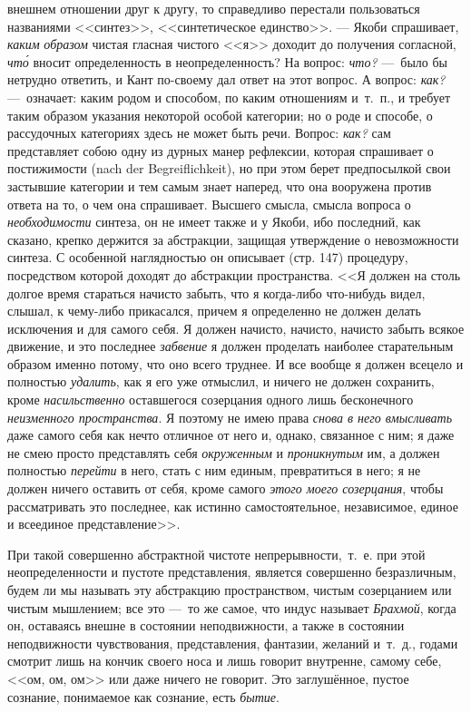 внешнем отношении друг к другу, то справедливо перестали пользоваться
названиями <<синтез>>, <<синтетическое единство>>. --- Якоби спрашивает,
{\em каким} {\em образом} чистая
гласная чистого <<я>> доходит до получения согласной,
{\em чт\'{о}} вносит определенность в неопределенность? На
вопрос: {\em что?} ---~было бы нетрудно ответить, и Кант
по-своему дал ответ на этот вопрос. А вопрос:
{\em как?} ---~означает: каким родом и способом, по каким
отношениям и~т.~п., и требует таким образом указания некоторой особой
категории; но о роде и способе, о рассудочных категориях здесь не может
быть речи. Вопрос: {\em как?} сам представляет собою
одну из дурных манер рефлексии, которая спрашивает о постижимости (nach der
Begreiflichkeit), но при этом берет предпосылкой свои застывшие категории и
тем самым знает наперед, что она вооружена против ответа на то, о чем она
спрашивает. Высшего смысла, смысла вопроса о
{\em необходимости} синтеза, он не имеет также и у
Якоби, ибо последний, как сказано, крепко держится за абстракции, защищая
утверждение о невозможности синтеза. С особенной наглядностью он описывает
(стр. 147) процедуру, посредством которой доходят до абстракции
пространства. <<Я должен на столь долгое время стараться начисто забыть, что
я когда-либо что-нибудь видел, слышал, к чему-либо прикасался, причем я
определенно не должен делать исключения и для самого себя. Я должен
начисто, начисто, начисто забыть всякое движение, и это последнее
{\em забвение} я должен проделать наиболее старательным
образом именно потому, что оно всего труднее. И все вообще я должен всецело
и полностью {\em удалить}, как я его уже отмыслил, и
ничего не должен сохранить, кроме {\em насильственно}
оставшегося созерцания одного лишь бесконечного
{\em неизменного пространства}. Я поэтому не имею права
{\em снова в него вмысливать} даже самого себя как
нечто отличное от него и, однако, связанное с ним; я даже не смею просто
представлять себя {\em окруженным} и
{\em проникнутым} им, а должен полностью
{\em перейти} в него, стать с ним единым, превратиться
в него; я не должен ничего оставить от себя, кроме самого
{\em этого моего созерцания}, чтобы рассматривать это
последнее, как истинно самостоятельное, независимое, единое и всеединое
представление>>.

При такой совершенно абстрактной чистоте непрерывности,~т.~е. при этой
неопределенности и пустоте представления, является совершенно безразличным,
будем ли мы называть эту абстракцию пространством, чистым созерцанием или
чистым мышлением; все это ---~то же самое, что индус называет
{\em Брахмой}, когда он, оставаясь внешне в состоянии
неподвижности, а также в состоянии неподвижности чувствования,
представления, фантазии, желаний и~т.~д., годами смотрит лишь на кончик
своего носа и лишь говорит внутренне, самому себе, <<ом, ом, ом>> или даже
ничего не говорит. Это заглушённое, пустое сознание, понимаемое как
сознание, есть {\em бытие}.

